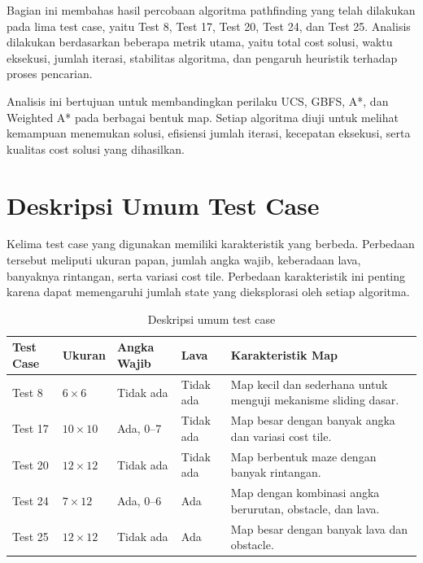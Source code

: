 Bagian ini membahas hasil percobaan algoritma pathfinding yang telah dilakukan pada lima test case, yaitu Test 8, Test 17, Test 20, Test 24, dan Test 25. 
Analisis dilakukan berdasarkan beberapa metrik utama, yaitu total cost solusi, waktu eksekusi, jumlah iterasi, stabilitas algoritma, dan pengaruh heuristik terhadap proses pencarian.

\begin{tcolorbox}[
	colback=blue!5,
	colframe=blue!60!black,
	title=\textbf{Tujuan Analisis Percobaan},
	arc=2mm,
	boxrule=0.8pt
]
Analisis ini bertujuan untuk membandingkan perilaku UCS, GBFS, A*, dan Weighted A* pada berbagai bentuk map. 
Setiap algoritma diuji untuk melihat kemampuan menemukan solusi, efisiensi jumlah iterasi, kecepatan eksekusi, serta kualitas cost solusi yang dihasilkan.
\end{tcolorbox}


\section{Deskripsi Umum Test Case}

Kelima test case yang digunakan memiliki karakteristik yang berbeda. 
Perbedaan tersebut meliputi ukuran papan, jumlah angka wajib, keberadaan lava, banyaknya rintangan, serta variasi cost tile. 
Perbedaan karakteristik ini penting karena dapat memengaruhi jumlah state yang dieksplorasi oleh setiap algoritma.

\begin{table}[H]
	\centering
	\caption{Deskripsi umum test case}
	\small
	\begin{tabular}{|p{2cm}|p{2cm}|p{2.2cm}|p{2cm}|p{4.8cm}|}
		\hline
		\rowcolor{blue!15}
		\textbf{Test Case} & \textbf{Ukuran} & \textbf{Angka Wajib} & \textbf{Lava} & \textbf{Karakteristik Map} \\
		\hline
		Test 8 & $6 \times 6$ & Tidak ada & Tidak ada & Map kecil dan sederhana untuk menguji mekanisme sliding dasar. \\
		\hline
		Test 17 & $10 \times 10$ & Ada, 0--7 & Tidak ada & Map besar dengan banyak angka dan variasi cost tile. \\
		\hline
		Test 20 & $12 \times 12$ & Tidak ada & Tidak ada & Map berbentuk maze dengan banyak rintangan. \\
		\hline
		Test 24 & $7 \times 12$ & Ada, 0--6 & Ada & Map dengan kombinasi angka berurutan, obstacle, dan lava. \\
		\hline
		Test 25 & $12 \times 12$ & Tidak ada & Ada & Map besar dengan banyak lava dan obstacle. \\
		\hline
	\end{tabular}
\end{table}

